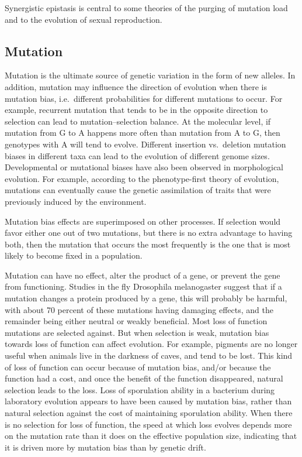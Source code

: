 Synergistic epistasis is central to some theories of the purging of mutation load and to the evolution of sexual reproduction.

\hypertarget{mutation}{%
\subsection{Mutation}\label{mutation}}

Mutation is the ultimate source of genetic variation in the form of new alleles. In addition, mutation may influence the direction of evolution when there is mutation bias, i.e.~different probabilities for different mutations to occur. For example, recurrent mutation that tends to be in the opposite direction to selection can lead to mutation--selection balance. At the molecular level, if mutation from G to A happens more often than mutation from A to G, then genotypes with A will tend to evolve. Different insertion vs.~deletion mutation biases in different taxa can lead to the evolution of different genome sizes. Developmental or mutational biases have also been observed in morphological evolution. For example, according to the phenotype-first theory of evolution, mutations can eventually cause the genetic assimilation of traits that were previously induced by the environment.

Mutation bias effects are superimposed on other processes. If selection would favor either one out of two mutations, but there is no extra advantage to having both, then the mutation that occurs the most frequently is the one that is most likely to become fixed in a population.

Mutation can have no effect, alter the product of a gene, or prevent the gene from functioning. Studies in the fly Drosophila melanogaster suggest that if a mutation changes a protein produced by a gene, this will probably be harmful, with about 70 percent of these mutations having damaging effects, and the remainder being either neutral or weakly beneficial. Most loss of function mutations are selected against. But when selection is weak, mutation bias towards loss of function can affect evolution. For example, pigments are no longer useful when animals live in the darkness of caves, and tend to be lost. This kind of loss of function can occur because of mutation bias, and/or because the function had a cost, and once the benefit of the function disappeared, natural selection leads to the loss. Loss of sporulation ability in a bacterium during laboratory evolution appears to have been caused by mutation bias, rather than natural selection against the cost of maintaining sporulation ability. When there is no selection for loss of function, the speed at which loss evolves depends more on the mutation rate than it does on the effective population size, indicating that it is driven more by mutation bias than by genetic drift.

